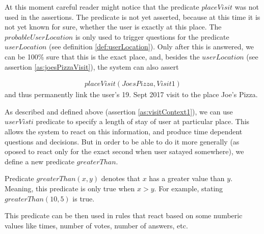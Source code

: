 At this moment careful reader might notice that the predicate $placeVisit$ was
not used in the assertions. The predicate is not yet asserted, because at 
this time it is not yet known for sure, whether the user is exactly at this 
place. The $probableUserLocation$ is only used to trigger questions for the
predicate $userLocation$ (see definition \ref{def:userLocation}). Only after 
this is answered, we can be
100\% sure that this is the exact place, and, besides the $userLocation$ (see
assertion \ref{as:joesPizzaVisit}), the system can also assert

\begin{equation}\label{as:placeVisit}
\begin{gathered}
	placeVisit(JoesPizza,Visit1)
\end{gathered}
\end{equation}
and thus permanently link the user's 19. Sept 2017 visit to the place 
Joe's Pizza.

As described and defined above (assertion \ref{as:visitContext1}), we can use
$userVisti$ predicate to specify a length of stay of user at particular place.
This allows the system to react on this information, and produce time dependent
questions and decisions. But in order to be able to do it more generally
(as oposed to react only for the exact second when user satayed somewhere), we
define a new predicate $greaterThan$.

\begin{definition}\label{def:greaterThan}
Predicate $greaterThan(x,y)$ denotes that $x$ has a greater value than $y$. 
Meaning, this predicate is only true when $x > y$. For example, 
stating $greaterThan(10, 5)$ is true.
\end{definition}
This predicate can be then used in rules that react based on some numberic 
values like times, number of votes, number of answers, etc.

